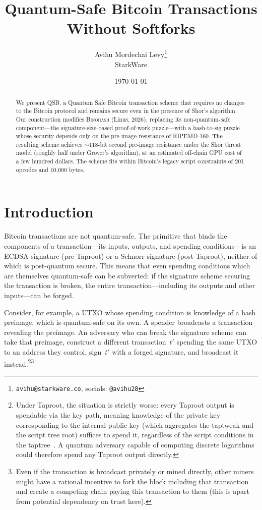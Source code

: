 \documentclass[11pt, a4paper]{article}
\title{\textbf{Quantum-Safe Bitcoin Transactions Without Softforks}}
\author{Avihu Mordechai Levy\footnote{\texttt{avihu@starkware.co}, socials: \texttt{@avihu28}}\\StarkWare}
\date{\today}
\begin{document}
\maketitle

\begin{abstract}
We present QSB, a Quantum Safe Bitcoin transaction scheme that requires no changes to the Bitcoin protocol and remains secure even in the presence of Shor's algorithm. Our construction modifies \textsc{Binohash} (Linus, 2026), replacing its non-quantum-safe component---the signature-size-based proof-of-work puzzle---with a hash-to-sig puzzle whose security depends only on the pre-image resistance of RIPEMD-160. The resulting scheme achieves ${\sim}118$-bit second pre-image resistance under the Shor threat model (roughly half under Grover's algorithm), at an estimated off-chain GPU cost of a few hundred dollars. The scheme fits within Bitcoin's legacy script constraints of 201 opcodes and 10{,}000 bytes.
\end{abstract}

\section{Introduction}
\label{sec:introduction}

Bitcoin transactions are not quantum-safe. The primitive that binds the components of a transaction---its inputs, outputs, and spending conditions---is an ECDSA signature (pre-Taproot) or a Schnorr signature (post-Taproot), neither of which is post-quantum secure. This means that even spending conditions which are themselves quantum-safe can be subverted: if the signature scheme securing the transaction is broken, the entire transaction---including its outputs and other inputs---can be forged.

Consider, for example, a UTXO whose spending condition is knowledge of a hash preimage, which is quantum-safe on its own. A spender broadcasts a transaction revealing the preimage. An adversary who can break the signature scheme can take that preimage, construct a different transaction~$t'$ spending the same UTXO to an address they control, sign~$t'$ with a forged signature, and broadcast it instead.\footnote{Under Taproot, the situation is strictly worse: every Taproot output is spendable via the key path, meaning knowledge of the private key corresponding to the internal public key (which aggregates the taptweak and the script tree root) suffices to spend it, regardless of the script conditions in the taptree~\cite{bip341}. A quantum adversary capable of computing discrete logarithms could therefore spend any Taproot output directly.}\footnote{Even if the transaction is broadcast privately or mined directly, other miners might have a rational incentive to fork the block including that transaction and create a competing chain paying this transaction to them (this is apart from potential dependency on trust here).}
\end{document}
